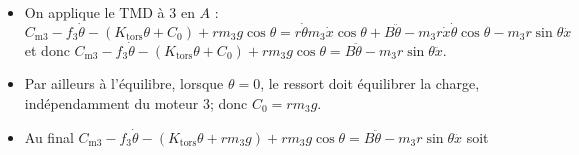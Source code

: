 \begin{corrige}
\begin{itemize}
%
%
%
%
%
%
\item On applique le TMD à 3 en $A$ : $ C_{\text{m3}}-f_3 \dot{\theta} -\left(K_{\text{tors}}\theta + C_0\right) +  rm_3g\cos \theta  = r  \dot{\theta} m_3 \dot{x} \cos \theta  + B\ddot{\theta} - m_3 r\dot{x}\dot{\theta}\cos\theta - m_3 r\sin\theta \ddot{x}$ et donc
$ C_{\text{m3}}-f_3 \dot{\theta} -\left(K_{\text{tors}}\theta + C_0\right) +  rm_3g\cos \theta  = B\ddot{\theta} - m_3 r\sin\theta \ddot{x}$. 
\item Par ailleurs à l'équilibre, lorsque $\theta=0$, le ressort doit équilibrer la charge, indépendamment du moteur 3; donc
$ C_0 =  rm_3g  $. 
\item Au final $ C_{\text{m3}}-f_3 \dot{\theta} -\left(K_{\text{tors}}\theta + rm_3g \right) +  rm_3g\cos \theta  = B\ddot{\theta} - m_3 r\sin\theta \ddot{x}$ soit


\end{itemize}
\end{corrige}
